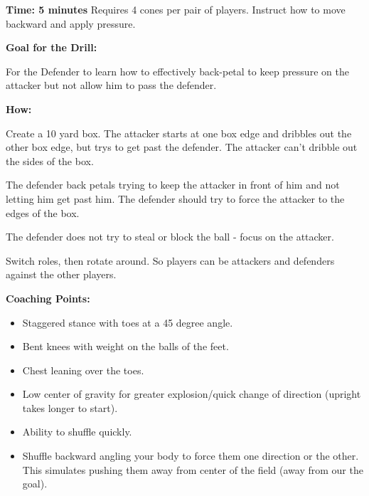 \documentclass[10pt,letterpaper]{article}
\newenvironment{evenBlock}[1]{%
    \tcolorbox[beamer,%
    noparskip,breakable,
    colback=LightGreen,colframe=DarkGreen,%
    colbacklower=LimeGreen!75!LightGreen,%
    title=#1]}%
    {\endtcolorbox}
\begin{document}
\textbf{Time: 5 minutes} Requires 4 cones per pair of players.
\begin{evenBlock}{Back-Petal}
Instruct how to move backward and apply pressure.

\textbf{Goal for the Drill:}

For the Defender to learn how to effectively back-petal to keep pressure on the attacker but not allow him to pass the defender.


\textbf{How:}

Create a 10 yard box.  The attacker starts at one box edge and dribbles out the other box edge, but trys to get past the defender.  The attacker can't dribble out the sides of the box.

The defender back petals trying to keep the attacker in front of him and not letting him get past him.  The defender should try to force the attacker to the edges of the box.

The defender does not try to steal or block the ball - focus on the attacker.

Switch roles, then rotate around.  So players can be attackers and defenders against the other players.

\textbf{Coaching Points:}
\begin{itemize}
    \item Staggered stance with toes at a 45 degree angle.
    \item Bent knees with weight on the balls of the feet.
    \item Chest leaning over the toes.
    \item Low center of gravity for greater explosion/quick change of direction (upright takes longer to start).
    \item Ability to shuffle quickly.
    \item Shuffle backward  angling your body to force them one direction or the other.  This simulates pushing them away from center of the field (away from our the goal).
\end{itemize}

\end{evenBlock}
\end{document}

